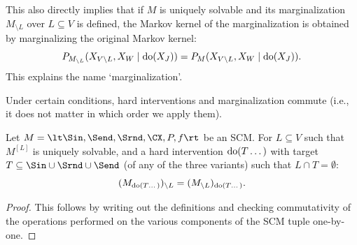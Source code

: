 \begin{Rem}
This also directly implies that if $M$ is uniquely solvable and its marginalization $M_{\setminus L}$ over $L \subseteq V$ is defined, the Markov kernel of the marginalization is obtained by marginalizing the original Markov kernel:
$$P_{M_{\setminus L}}(X_{V\setminus L},X_W \mid \operatorname{do}(X_J)) = P_{M}(X_{V\setminus L},X_W \mid \operatorname{do}(X_J)).$$
This explains the name `marginalization'.
\end{Rem}

Under certain conditions, hard interventions and marginalization commute (i.e., it does not matter in which order we apply them).
\begin{Prp}\label{prp:interventions_marginalizations_commute}
Let $M = \lt \Sin, \Send, \Srnd, \CX, P, f \rt$ be an SCM.
    For $L \subseteq V$ such that $M^{[L]}$ is uniquely solvable,
    and a hard intervention $\operatorname{do}(T\dots)$ with target $T \subseteq \Sin \cup \Srnd \cup \Send$ (of any of the three variants) such that $L \cap T = \emptyset$:
    $$(M_{\operatorname{do}(T\dots)})_{\setminus L} = (M_{\setminus L})_{\operatorname{do}(T\dots)}.$$
\end{Prp}
\begin{proof}
  This follows by writing out the definitions and checking commutativity of
  the operations performed on the various components of the SCM tuple one-by-one. 
\end{proof}

